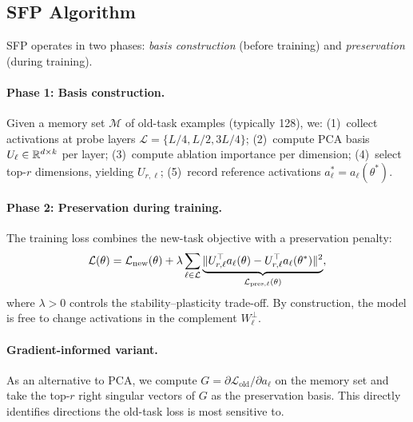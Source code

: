 \subsection{SFP Algorithm}
\label{sec:algorithm}

SFP operates in two phases: \emph{basis construction} (before training) and \emph{preservation} (during training).

\paragraph{Phase 1: Basis construction.}
Given a memory set $\mathcal{M}$ of old-task examples (typically 128), we:
(1)~collect activations at probe layers $\mathcal{L} = \{L/4, L/2, 3L/4\}$;
(2)~compute PCA basis $U_\ell \in \mathbb{R}^{d \times k}$ per layer;
(3)~compute ablation importance per dimension;
(4)~select top-$r$ dimensions, yielding $U_{r,\ell}$;
(5)~record reference activations $a_\ell^* = a_\ell(\theta^*)$.

\paragraph{Phase 2: Preservation during training.}
The training loss combines the new-task objective with a preservation penalty:
\begin{equation}
    \mathcal{L}(\theta) = \mathcal{L}_{\text{new}}(\theta) + \lambda \sum_{\ell \in \mathcal{L}} \underbrace{\| U_{r,\ell}^\top a_\ell(\theta) - U_{r,\ell}^\top a_\ell(\theta^*) \|^2}_{\mathcal{L}_{\text{pres},\ell}(\theta)},
    \label{eq:sfp_loss}
\end{equation}
where $\lambda > 0$ controls the stability--plasticity trade-off.
By construction, the model is free to change activations in the complement $W_\ell^\perp$.

\paragraph{Gradient-informed variant.}
As an alternative to PCA, we compute $G = \partial \mathcal{L}_{\text{old}} / \partial a_\ell$ on the memory set and take the top-$r$ right singular vectors of $G$ as the preservation basis.
This directly identifies directions the old-task loss is most sensitive to.

